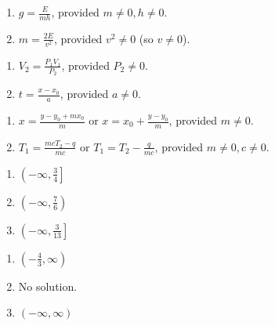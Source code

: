 \documentclass{ximera}
\begin{document}
\begin{multicols}{2}
\begin{enumerate}
\setcounter{enumi}{\value{HW}}
\item $g = \frac{E}{mh}$, provided $m \neq 0, h \neq 0$.
\item $m = \frac{2E}{v^2}$, provided $v^2 \neq 0$ (so $v \neq 0$).
\setcounter{HW}{\value{enumi}}
\end{enumerate}
\end{multicols}


\begin{multicols}{2}
\begin{enumerate}
\setcounter{enumi}{\value{HW}}
\item $V_{2} = \frac{P_{1}V_{1}}{P_{2}}$, provided $P_{2} \neq 0$. 
\item $t = \frac{x - x_{0}}{a}$, provided $a \neq 0$.
\setcounter{HW}{\value{enumi}}
\end{enumerate}
\end{multicols}


\begin{enumerate}
\setcounter{enumi}{\value{HW}}
\item $x = \frac{y-y_{0} + mx_{0}}{m}$ or $x = x_{0} + \frac{y-y_{0}}{m}$, provided $m \neq 0$. 
\item $T_{1} = \frac{mcT_{2} - q}{mc}$ or $T_{1} = T_{2} - \frac{q}{mc} $, provided $m \neq 0, c \neq 0$.  
\setcounter{HW}{\value{enumi}}
\end{enumerate}


\begin{multicols}{3}
\begin{enumerate}
\setcounter{enumi}{\value{HW}}
\addtocounter{enumi}{1}
\item $\left(-\infty, \frac{3}{4}\right]$
\item $\left(-\infty, \frac{7}{6} \right)$  
\item  $\left( -\infty,  \frac{3}{13}\right]$

\setcounter{HW}{\value{enumi}}
\end{enumerate}
\end{multicols}

\begin{multicols}{3}
\begin{enumerate}
\setcounter{enumi}{\value{HW}}

\item $\left(-\frac{4}{3}, \infty\right)$
\item No solution.
\item $(-\infty, \infty)$

\setcounter{HW}{\value{enumi}}
\end{enumerate}
\end{multicols}
\end{document}
